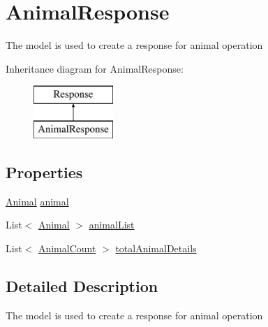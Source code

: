 \hypertarget{classWildLifeTracker_1_1Response_1_1AnimalResponse}{}\section{Animal\+Response}
\label{classWildLifeTracker_1_1Response_1_1AnimalResponse}


The model is used to create a response for animal operation  


Inheritance diagram for Animal\+Response\+:\begin{figure}[H]
\begin{center}
\leavevmode
\includegraphics[height=2.000000cm]{classWildLifeTracker_1_1Response_1_1AnimalResponse}
\end{center}
\end{figure}
\subsection*{Properties}
\begin{DoxyCompactItemize}
\item 
\hyperlink{classWildLifeTracker_1_1Models_1_1Animal}{Animal} \hyperlink{classWildLifeTracker_1_1Response_1_1AnimalResponse_a364c7e4092980c5a9be7c56a2c810c18}{animal}
\item 
List$<$ \hyperlink{classWildLifeTracker_1_1Models_1_1Animal}{Animal} $>$ \hyperlink{classWildLifeTracker_1_1Response_1_1AnimalResponse_a4c541d3fabb48f76436375ec172d1f8f}{animal\+List}
\item 
List$<$ \hyperlink{classWildLifeTracker_1_1Models_1_1AnimalCount}{Animal\+Count} $>$ \hyperlink{classWildLifeTracker_1_1Response_1_1AnimalResponse_ae903caec3c5fee29b30564b40d89cd18}{total\+Animal\+Details}
\end{DoxyCompactItemize}


\subsection{Detailed Description}
The model is used to create a response for animal operation 



